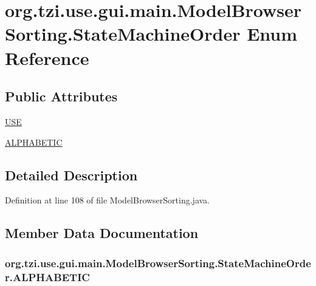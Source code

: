 \hypertarget{enumorg_1_1tzi_1_1use_1_1gui_1_1main_1_1_model_browser_sorting_1_1_state_machine_order}{\section{org.\-tzi.\-use.\-gui.\-main.\-Model\-Browser\-Sorting.\-State\-Machine\-Order Enum Reference}
\label{enumorg_1_1tzi_1_1use_1_1gui_1_1main_1_1_model_browser_sorting_1_1_state_machine_order}
}
\subsection*{Public Attributes}
\begin{DoxyCompactItemize}
\item 
\hyperlink{enumorg_1_1tzi_1_1use_1_1gui_1_1main_1_1_model_browser_sorting_1_1_state_machine_order_a179a3bec29686d676f8aaf9b2bff2f4d}{U\-S\-E}
\item 
\hyperlink{enumorg_1_1tzi_1_1use_1_1gui_1_1main_1_1_model_browser_sorting_1_1_state_machine_order_a248ca35a84b31c894421551c29308ee2}{A\-L\-P\-H\-A\-B\-E\-T\-I\-C}
\end{DoxyCompactItemize}


\subsection{Detailed Description}


Definition at line 108 of file Model\-Browser\-Sorting.\-java.



\subsection{Member Data Documentation}
\hypertarget{enumorg_1_1tzi_1_1use_1_1gui_1_1main_1_1_model_browser_sorting_1_1_state_machine_order_a248ca35a84b31c894421551c29308ee2}{
\subsubsection[{A\-L\-P\-H\-A\-B\-E\-T\-I\-C}]{\setlength{\rightskip}{0pt plus 5cm}org.\-tzi.\-use.\-gui.\-main.\-Model\-Browser\-Sorting.\-State\-Machine\-Order.\-A\-L\-P\-H\-A\-B\-E\-T\-I\-C}}\label{enumorg_1_1tzi_1_1use_1_1gui_1_1main_1_1_model_browser_sorting_1_1_state_machine_order_a248ca35a84b31c894421551c29308ee2}


